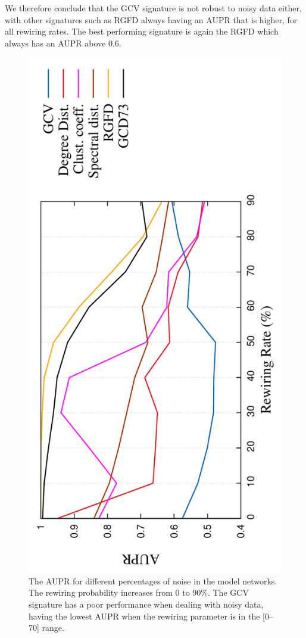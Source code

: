 We therefore conclude that the GCV signature is not robust to noisy data either, with other signatures such as RGFD always having an AUPR that is higher, for all rewiring rates. The best performing signature is again the RGFD which always has an AUPR above 0.6.
\begin{figure}[H]
  \hspace{-1.5em}
  \includegraphics[scale=0.7, angle=-90]
  {../code/final_results/trade_2010_thresholded/eval_results/rew_aupr_all_sigs2.pdf}
  \caption[The AUPR for different percentages of noise in the model networks]{The AUPR for different percentages of noise in the model networks. The rewiring probability increases from 0 to 90\%. The GCV signature has a poor performance when dealing with noisy data, having the lowest AUPR when the rewiring parameter is in the [0--70] range.}
  \label{fig:rew_aupr}
\end{figure}

